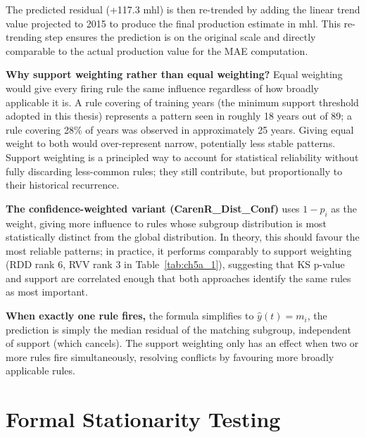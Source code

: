 The predicted residual (+117.3 mhl) is then re-trended by adding the linear trend value projected to 2015 to produce the final production estimate in mhl. This re-trending step ensures the prediction is on the original scale and directly comparable to the actual production value for the MAE computation.

\textbf{Why support weighting rather than equal weighting? }Equal weighting would give every firing rule the same influence regardless of how broadly applicable it is. A rule covering  of training years (the minimum support threshold adopted in this thesis) represents a pattern seen in roughly 18 years out of 89; a rule covering 28\% of years was observed in approximately 25 years. Giving equal weight to both would over-represent narrow, potentially less stable patterns. Support weighting is a principled way to account for statistical reliability without fully discarding less-common rules; they still contribute, but proportionally to their historical recurrence.

\textbf{The confidence-weighted variant (CarenR\_Dist\_Conf) }uses $1-p_i$ as the weight, giving more influence to rules whose subgroup distribution is most statistically distinct from the global distribution. In theory, this should favour the most reliable patterns; in practice, it performs comparably to support weighting (RDD rank 6, RVV rank 3 in Table~\ref{tab:ch5a_1}), suggesting that KS p-value and support are correlated enough that both approaches identify the same rules as most important.

\textbf{When exactly one rule fires, }the formula simplifies to $\hat{y}(t) = m_i$, the prediction is simply the median residual of the matching subgroup, independent of support (which cancels). The support weighting only has an effect when two or more rules fire simultaneously, resolving conflicts by favouring more broadly applicable rules.




\section{Formal Stationarity Testing}\label{sec:formal_stationarity_testing}


